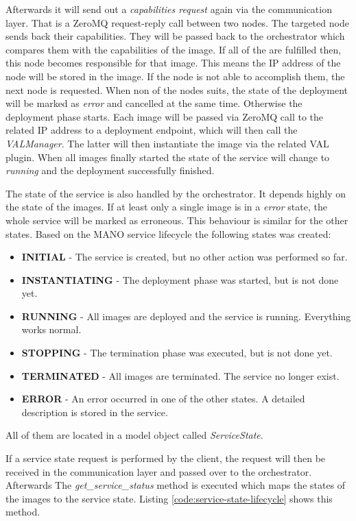 Afterwards it will send out a \textit{capabilities request} again via the communication layer.
That is a ZeroMQ request-reply call between two nodes.
The targeted node sends back their capabilities.
They will be passed back to the orchestrator which compares them with the capabilities of the image.
If all of the are fulfilled then, this node becomes responsible for that image.
This means the \ac{IP} address of the node will be stored in the image.
If the node is not able to accomplish them, the next node is requested.
When non of the nodes suits, the state of the deployment will be marked as \textit{error} and cancelled at the same time.
Otherwise the deployment phase starts.
Each image will be passed via ZeroMQ call to the related \ac{IP} address to a deployment endpoint, which will then call the \textit{VALManager}.
The latter will then instantiate the image via the related \ac{VAL} plugin.
When all images finally started the state of the service will change to \textit{running} and the deployment successfully finished.

The state of the service is also handled by the orchestrator.
It depends highly on the state of the images.
If at least only a single image is in a \textit{error} state, the whole service will be marked as erroneous.
This behaviour is similar for the other states.
Based on the \ac{MANO} service lifecycle the following states was created:

\begin{itemize}
  \item \textbf{INITIAL} - The service is created, but no other action was performed so far.
  \item \textbf{INSTANTIATING} - The deployment phase was started, but is not done yet.
  \item \textbf{RUNNING} - All images are deployed and the service is running. Everything works normal.
  \item \textbf{STOPPING} - The termination phase was executed, but is not done yet.
  \item \textbf{TERMINATED} - All images are terminated. The service no longer exist.
  \item \textbf{ERROR} - An error occurred in one of the other states. A detailed description is stored in the service.
\end{itemize}

All of them are located in a model object called \textit{ServiceState}.

If a service state request is performed by the client, the request will then be received in the communication layer and passed over to the orchestrator.
Afterwards The \textit{get\_service\_status} method is executed which maps the states of the images to the service state.
Listing \ref{code:service-state-lifecycle} shows this method.


